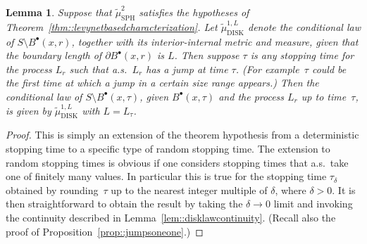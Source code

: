 \documentclass[10pt]{amsart}
\newcommand{\sbullet}{{\scriptscriptstyle\bullet}}
\theoremstyle{plain}
\numberwithin{theorem}{section}
\newtheorem{lemma}[theorem]{Lemma}
\theoremstyle{definition}
\newcommand{\tmustwo}{\wt{\mu}_{\mathrm{SPH}}^2}
\newcommand{\tmudonel}{\wt{\mu}_{ \mathrm{DISK}}^{1, L}}
\let\wt\widetilde
\newcommand{\fb}[2]{B^\sbullet(#1,#2)}
\begin{document}
\begin{lemma}
\label{lem::markovatjumpstop}
Suppose that $\tmustwo$ satisfies the hypotheses of Theorem~\ref{thm::levynetbasedcharacterization}. Let $\tmudonel$ denote the conditional law of $S \setminus \fb{x}{r}$, together with its interior-internal metric and measure, given that the boundary length of $\partial \fb{x}{r}$ is $L$. Then suppose $\tau$ is any stopping time for the process $L_r$ such that a.s.\ $L_r$ has a jump at time $\tau$. (For example~$\tau$ could be the first time at which a jump in a certain size range appears.) Then the conditional law of $S \setminus \fb{x}{\tau}$, given $\fb{x}{\tau}$ and the process $L_r$ up to time~$\tau$, is given by $\tmudonel$ with $L= L_\tau$.
\end{lemma}
\begin{proof}
This is simply an extension of the theorem hypothesis from a deterministic stopping time to a specific type of random stopping time. The extension to random stopping times is obvious if one considers stopping times that a.s.\ take one of finitely many values. In particular this is true for the stopping time $\tau_\delta$ obtained by rounding~$\tau$ up to the nearest integer multiple of $\delta$, where $\delta>0$. It is then straightforward to obtain the result by taking the $\delta \to 0$ limit and invoking the continuity described in Lemma~\ref{lem::disklawcontinuity}. (Recall also the proof of Proposition~\ref{prop::jumpsoneone}.)
\end{proof}
\end{document}
